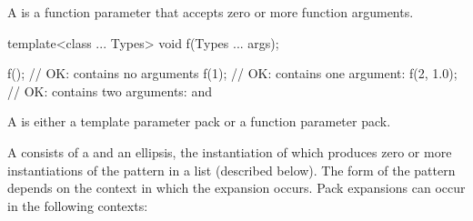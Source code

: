 \pnum
A  is a function parameter
that accepts zero or more function arguments. \begin{example}

\begin{codeblock}
template<class ... Types> void f(Types ... args);

f();                            // OK:  contains no arguments
f(1);                           // OK:  contains one argument: 
f(2, 1.0);                      // OK:  contains two arguments:  and 
\end{codeblock}

\end{example}

\pnum
A  is either a template parameter
pack or a function parameter pack.

\pnum
{}%
A 
consists of a  and an ellipsis, the instantiation of which
produces zero or more instantiations of the pattern in a list (described below).
The form of the pattern
depends on the context in which the expansion occurs. Pack
expansions can occur in the following contexts:

